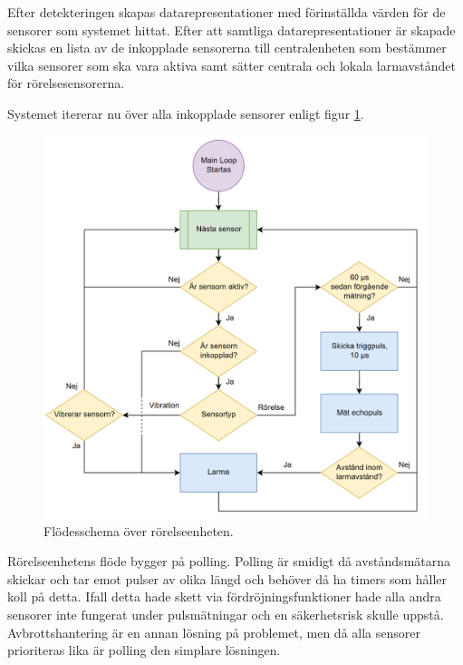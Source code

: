 \documentclass{article}
\begin{document}
Efter detekteringen skapas datarepresentationer med förinställda värden för de
sensorer som systemet hittat. Efter att samtliga datarepresentationer är skapade skickas
en lista av de inkopplade sensorerna till centralenheten som bestämmer vilka sensorer som ska vara aktiva
samt sätter centrala och lokala larmavståndet för rörelsesensorerna.

\begin{flushleft}
Systemet itererar nu över alla inkopplade sensorer enligt figur \ref{fig:MotionFlow}. \linebreak \newline
\end{flushleft}

\begin{figure}
\centering
\includegraphics[scale=0.3]{figurer/FlowchartMotion.png}
\caption{Flödesschema över rörelseenheten.}
 \label{fig:MotionFlow}
\end{figure}

Rörelseenhetens flöde bygger på polling. Polling är smidigt då avståndsmätarna skickar och tar emot pulser av olika längd 
och behöver då ha timers som håller koll på detta. Ifall detta hade skett via fördröjningsfunktioner hade alla andra sensorer 
inte fungerat under pulsmätningar och en säkerhetsrisk skulle uppstå. Avbrottshantering är en annan lösning på problemet, 
men då alla sensorer prioriteras lika är polling den simplare lösningen.
\end{document}
